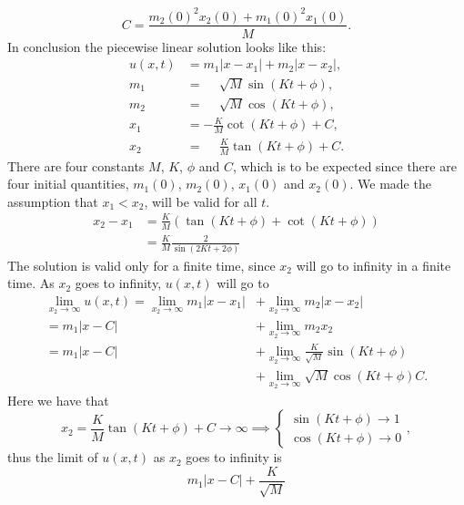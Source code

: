 \documentclass[english,master]{liumaiex}
\theoremstyle{plain}
\theoremstyle{definition}
\begin{document}
\begin{equation}
	C = \frac{m_2(0)^2 x_2(0) + m_1(0)^2 x_1(0)}{M}.
\end{equation}
In conclusion the piecewise linear solution looks like this:
\begin{align}
	u(x, t) &= m_1|x - x_1| + m_2|x - x_2|, \\
	m_1 &= \phantom{-}\sqrt{M} \sin(Kt + \phi), \\
	m_2 &= \phantom{-}\sqrt{M} \cos(Kt + \phi), \\
	x_1 &= -\frac{K}{M}\cot(Kt + \phi) + C, \\
	x_2 &= \phantom{-}\frac{K}{M}\tan(Kt + \phi) + C.
\end{align}
%
There are four constants $M$, $K$, $\phi$ and $C$, which is to be expected since there are four initial quantities, $m_1(0)$, $m_2(0)$, $x_1(0)$ and $x_2(0)$. We made the assumption that $x_1 < x_2$, will be valid for all $t$.
\begin{equation}
\begin{aligned}
	x_2 - x_1 
	&= \frac{K}{M}(\tan(Kt + \phi) + \cot(Kt + \phi)) \\
	&= \frac{K}{M}\frac{2}{\sin(2Kt + 2\phi)}
\end{aligned}
\end{equation}
The solution is valid only for a finite time, since $x_2$ will go to infinity in a finite time. As $x_2$ goes to infinity, $u(x,t)$ will go to
\begin{equation}
\begin{aligned}
	\lim_{x_2 \to \infty} u(x, t)
	= \lim_{x_2 \to \infty} m_1|x - x_1| &+ \lim_{x_2 \to \infty} m_2|x - x_2| \\
	= m_1|x - C| &+ \lim_{x_2 \to \infty} m_2 x_2 \\
	= m_1|x - C| &+ \lim_{x_2 \to \infty} \frac{K}{\sqrt{M}} \sin(Kt + \phi) \\
	&+ \lim_{x_2 \to \infty} \sqrt{M} \cos(Kt + \phi) C.
\end{aligned}
\end{equation}
Here we have that
\begin{equation}
	x_2 = \frac{K}{M}\tan(Kt + \phi) + C \rightarrow \infty \implies 
		\begin{cases} 
			\sin(K t + \phi) \rightarrow 1 \\
			\cos(K t + \phi) \rightarrow 0
		\end{cases},
\end{equation}
thus the limit of $u(x,t)$ as $x_2$ goes to infinity is
\begin{equation}
	m_1|x - C| + \frac{K}{\sqrt{M}}
\end{equation}
\end{document}
